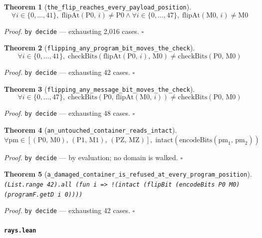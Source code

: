 \documentclass[11pt]{article}
\newtheorem{theorem}{Theorem}[section]
\begin{document}
\begin{theorem}[\texttt{the\_flip\_reaches\_every\_payload\_position}]
\[ \forall i \in \{0,\dots,41\},\; \mathrm{flipAt}\mathopen{}\left(\mathrm{P0},\,i\right) \neq \mathrm{P0} \land \forall i \in \{0,\dots,47\},\; \mathrm{flipAt}\mathopen{}\left(\mathrm{M0},\,i\right) \neq \mathrm{M0} \]
\end{theorem}
\noindent\emph{Proof.} \texttt{by decide} --- exhausting 2,016 cases. \hfill$\square$

\begin{theorem}[\texttt{flipping\_any\_program\_bit\_moves\_the\_check}]
\[ \forall i \in \{0,\dots,41\},\; \mathrm{checkBits}\mathopen{}\left(\mathrm{flipAt}\mathopen{}\left(\mathrm{P0},\,i\right),\,\mathrm{M0}\right) \neq \mathrm{checkBits}\mathopen{}\left(\mathrm{P0},\,\mathrm{M0}\right) \]
\end{theorem}
\noindent\emph{Proof.} \texttt{by decide} --- exhausting 42 cases. \hfill$\square$

\begin{theorem}[\texttt{flipping\_any\_message\_bit\_moves\_the\_check}]
\[ \forall i \in \{0,\dots,47\},\; \mathrm{checkBits}\mathopen{}\left(\mathrm{P0},\,\mathrm{flipAt}\mathopen{}\left(\mathrm{M0},\,i\right)\right) \neq \mathrm{checkBits}\mathopen{}\left(\mathrm{P0},\,\mathrm{M0}\right) \]
\end{theorem}
\noindent\emph{Proof.} \texttt{by decide} --- exhausting 48 cases. \hfill$\square$

\begin{theorem}[\texttt{an\_untouched\_container\_reads\_intact}]
\[ \forall \mathrm{pm} \in [\left(\mathrm{P0},\,\mathrm{M0}\right),\,\left(\mathrm{P1},\,\mathrm{M1}\right),\,\left(\mathrm{PZ},\,\mathrm{MZ}\right)],\; \mathrm{intact}\mathopen{}\left(\mathrm{encodeBits}\mathopen{}\left(\mathrm{pm}_{1},\,\mathrm{pm}_{2}\right)\right) \]
\end{theorem}
\noindent\emph{Proof.} \texttt{by decide} --- by evaluation; no domain is walked. \hfill$\square$

\begin{theorem}[\texttt{a\_damaged\_container\_is\_refused\_at\_every\_program\_position}]
\texttt{(List.range 42).all (fun i => !(intact (flipBit (encodeBits P0 M0) (programF.getD i 0))))}
\end{theorem}
\noindent\emph{Proof.} \texttt{by decide} --- exhausting 42 cases. \hfill$\square$

\paragraph{\texttt{rays.lean}}
\end{document}
